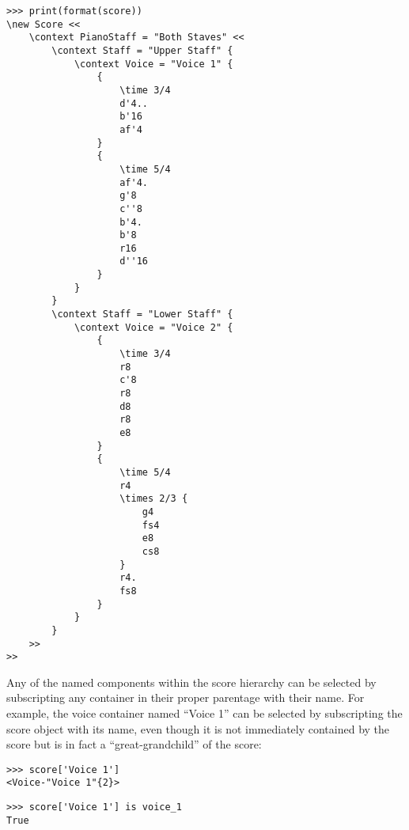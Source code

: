 \begin{abjadbookoutput}
\begin{singlespacing}
\vspace{-0.5\baselineskip}
\begin{verbatim}
>>> print(format(score))
\new Score <<
    \context PianoStaff = "Both Staves" <<
        \context Staff = "Upper Staff" {
            \context Voice = "Voice 1" {
                {
                    \time 3/4
                    d'4..
                    b'16
                    af'4
                }
                {
                    \time 5/4
                    af'4.
                    g'8
                    c''8
                    b'4.
                    b'8
                    r16
                    d''16
                }
            }
        }
        \context Staff = "Lower Staff" {
            \context Voice = "Voice 2" {
                {
                    \time 3/4
                    r8
                    c'8
                    r8
                    d8
                    r8
                    e8
                }
                {
                    \time 5/4
                    r4
                    \times 2/3 {
                        g4
                        fs4
                        e8
                        cs8
                    }
                    r4.
                    fs8
                }
            }
        }
    >>
>>
\end{verbatim}
\end{singlespacing}
\end{abjadbookoutput}

\noindent Any of the named components within the score hierarchy can be
selected by subscripting any container in their proper parentage with their
name. For example, the voice container named \enquote{Voice 1} can be selected
by subscripting the score object with its name, even though it is not
immediately contained by the score but is in fact a \enquote{great-grandchild}
of the score:

\begin{comment}
<abjad>
score['Voice 1']
score['Voice 1'] is voice_1
</abjad>
\end{comment}

\begin{abjadbookoutput}
\begin{singlespacing}
\vspace{-0.5\baselineskip}
\begin{verbatim}
>>> score['Voice 1']
<Voice-"Voice 1"{2}>
\end{verbatim}
\begin{verbatim}
>>> score['Voice 1'] is voice_1
True
\end{verbatim}
\end{singlespacing}
\end{abjadbookoutput}

